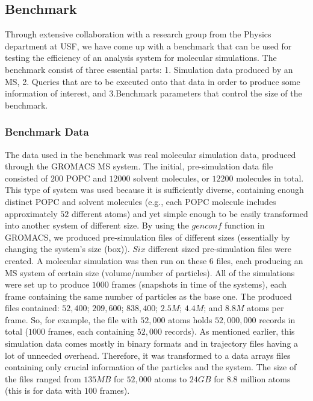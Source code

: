 \documentclass[10pt,journal,final,letterpaper,twocolumn]{IEEEtran}
\begin{document}

\subsection{Benchmark}

Through extensive collaboration with a research group from the
Physics department at USF, we have come up with a benchmark that can
be used for testing the efficiency of an analysis system for
molecular simulations. The benchmark consist of three essential
parts: 1. Simulation data produced by an MS, 2. Queries that are to
be executed onto that data in order to produce some information of
interest, and 3.Benchmark parameters that control the size of the
benchmark.


\subsubsection{Benchmark Data}
The data used in the benchmark was real molecular simulation data,
produced through the GROMACS MS system. The initial, pre-simulation
data file consisted of $200$ POPC and $12000$ solvent molecules, or
$12200$ molecules in total. This type of system was used because it
is sufficiently diverse, containing enough distinct POPC and solvent
molecules (e.g., each POPC molecule includes approximately $52$
different atoms) and yet simple enough to be easily transformed into
another system of different size. By using the $genconf$ function in
GROMACS, we produced pre-simulation files of different sizes
(essentially by changing the system's size (box)). $Six$ different
sized pre-simulation files were created. A molecular simulation was
then run on these $6$ files, each producing an MS system of certain
size (volume/number of particles). All of the simulations were set
up to produce $1000$ frames (snapshots in time of the systems), each
frame containing the same number of particles as the base one. The
produced files contained: $52,400$; $209,600$; $838,400$; $2.5M$;
$4.4M$; and $8.8M$ atoms per frame. So, for example, the file with
$52,000$ atoms holds $52,000,000$ records in total ($1000$ frames,
each containing $52,000$ records). As mentioned earlier, this
simulation data comes mostly in binary formats and in trajectory
files having a lot of unneeded overhead. Therefore, it was
transformed to a data arrays files containing only crucial
information of the particles and the system. The size of the files
ranged from $135MB$ for $52,000$ atoms to $24GB$ for $8.8$ million
atoms (this is for data with $100$ frames).
\end{document}

